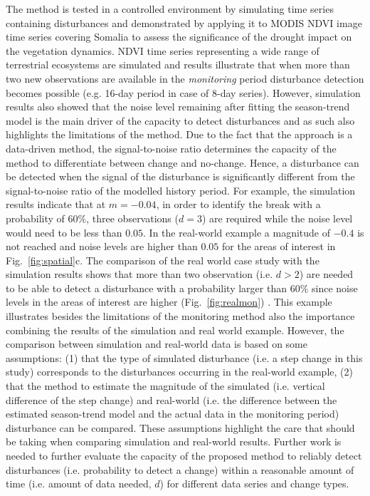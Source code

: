 \documentclass[authoryear,preprint,review,10pt]{elsarticle}
\begin{document}
The method is tested in a controlled environment by simulating time series containing disturbances and demonstrated by applying it to MODIS NDVI image time series covering Somalia to assess the significance of the drought impact on the vegetation dynamics. NDVI time series representing a wide range of terrestrial ecosystems are simulated and results illustrate that when more than two new observations are available in the \emph{monitoring} period disturbance detection becomes possible (e.g. 16-day period in case of 8-day series). However, simulation results also showed that the noise level remaining after fitting the season-trend model is the main driver of the capacity to detect disturbances and as such also highlights the limitations of the method. Due to the fact that the approach is a data-driven method, the signal-to-noise ratio determines the capacity of the method to differentiate between change and no-change. Hence, a disturbance can be detected when the signal of the disturbance is significantly different from the signal-to-noise ratio of the modelled history period. For example, the simulation results indicate that at $m = -0.04$, in order to identify the break with a probability of $60\%$, three observations ($d=3$) are required while the noise level would need to be less than $0.05$. In the real-world example a magnitude of $-0.4$ is not reached and noise levels are higher than $0.05$ for the areas of interest in Fig.~\ref{fig:spatial}c. The comparison of the real world case study with the simulation results shows that more than two observation (i.e. $d>2$) are needed to be able to detect a disturbance with a probability larger than $60\%$ since noise levels in the areas of interest are higher (Fig.~\ref{fig:realmon}) . 
This example illustrates besides the limitations of the monitoring method also the importance combining the results of the simulation and real world example. However, the comparison between simulation and real-world data is based on some assumptions: (1) that the type of simulated disturbance (i.e. a step change in this study) corresponds to the disturbances occurring in the real-world example, (2) that the method to estimate the magnitude of the simulated (i.e. vertical difference of the step change) and real-world (i.e. the difference between the estimated season-trend model and the actual data in the monitoring period) disturbance can be compared. These assumptions highlight the care that should be taking when comparing simulation and real-world results. 
Further work is needed to further evaluate the capacity of the proposed method to reliably detect disturbances (i.e. probability to detect a change) within a reasonable amount of time (i.e. amount of data needed, $d$) for different data series and change types. 
\end{document}
